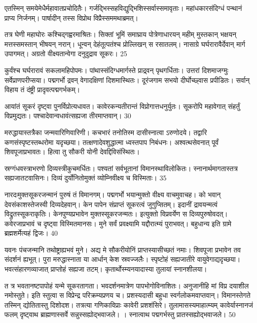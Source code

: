   एतस्मिन् समयेमेधैर्महावातप्रचोदितैः।
 गर्जद्भिस्सहविद्युद्भिशिस्सर्वास्समावृताः।
 महांधकारसंदिग्धं पन्थानं प्राप्य निर्जनम्।
 पार्षादीन् तस्स विप्रोथ विप्रैस्सममथाब्रमत्।
 
तत्र घेणी महाघोरः कश्चिद्गह्वरमाश्रितः।
 सिक्तां भूमिं समाघ्राय पोत्रेणाधारयन् महीम् मुस्तकान् भक्षयन् मत्तस्समस्तान् भीषयन् नरान्।
 धून्वन् देहंतूत्पतंश्च प्रोल्लिखन् स रसातलम्।
 नासाग्रे घर्घरारावैर्देवान् मार्ग उपागमत्।
 अग्रतो वीक्ष्यतान्वेगा दनुदुद्राव सूकरः।
 25

  कुर्वंश्च घर्घरारावं सकलामहिपोपमः।
 पांथास्संदिग्धमार्गस्ते प्राद्र्वन् पृथगर्धिताः।
 उत्तरां दिशमाजग्मुः सर्वेप्राणपरीप्सया।
 पद्मगर्भो द्रवन् वेगादक्षिणां दिशमास्थितः।
 दूरंजगाम सभयो दीर्घोच्छ्वास प्रपीडितः।
 सर्वान् विहाय तं दंष्ट्री प्रादृवत्पद्मगर्भकम्।
 
आयांतं सूकरं दृष्ट्वा पुनर्विप्रोत्यधावत।
 कावेरकन्यतीरान्तं विप्रोगात्तधनुर्युतः।
 सूकरोपि महावेगात् संहर्तुं विप्रमुद्यतः।
 पश्चादेवान्वधावंत्सह्यजा तीरमाप्तवान्।
 30

  मरुद्धायास्तत्रैका जन्मवारिणिवारिणी।
 कचभारं तनोतिस्म दासीस्नात्वा ऽरुणोदये।
 तद्वारि कणसंस्पृष्टस्तब्धरोमा यदृच्छया।
 तत्क्षणादेवशुद्धात्मा ध्वस्तपाप निबंधनः।
 अश्वत्थसेवनात् पूर्वं शिवपूजाप्रभावतः।
 हित्वा तु सौकरी योनी देवद्दिविसंस्थितः।
 
स्रग्गंधवस्त्राभरणो दिव्यस्त्रीकुचमर्धितः।
 पश्यतां सर्वभूतानां विमानस्थाविलोकितः।
 स्नानार्थमागतास्तत्र सह्यजातटवासिनः।
 दिव्यं दुर्योनितोमुक्तं व्योम्निवीक्ष्य च विस्मिताः।
 35

  नारदःमुक्तसूकरजन्मानं पुरुषं तं विमानगम्।
 पद्मगर्भो भयान्मुक्तो वीक्ष्य वाचमुवाचह।
 को भवान् देवसंकाशस्तेजस्वी दिव्यदेहवान्।
 केन पापेन संप्राप्तं सूकरत्वं जुगुप्सितम्।
 इदानीं द्रावयन्मत्वं विद्रुतस्सूकराकृतिः।
 केनपुण्यप्रभावेन मुक्तस्सूकरजन्मतः।
 इत्युक्तो विप्रवर्येण स दिव्यपुरुषोवदत्।
 कवेरजाप्रभावं च दृष्ट्वा विस्मितमानसः।
 मुने सर्वं प्रवक्ष्यामि यद्दौरात्म्यं पुराभवत्।
 बहुधान्य इति ग्रामे ब्रह्मशर्मेत्यहं द्विजः।
 40

  यवनः पंचजन्मानि तथोष्ट्राह्यभवं मुने।
 अद्य मे सौकरीयोनिं प्राप्तस्यासीच्छतं नमाः।
 शिवपूजा प्रभावेन तव संदर्शनं ह्यभूत्।
 पुरा मरुद्धास्नाता या आर्धान् केश स्रवज्जलैः।
 स्पृष्टोहं सह्यजातीरे वायुवेगाद्यदृच्छया।
 भवत्संहारणव्याजात् प्राप्तोहं सह्यजा तटम्।
 कृतार्थोस्म्यनयादास्या तुलायां स्नानशीलया।
 
त
त्र
भवतानष्टपापोहं यन्मे सूकरतागता।
 भवदर्शनमात्रेण पापभोगोविनाशितः।
 अनुजानीहि मां विप्र दयाशील नमोस्तुते।
 इति स्तुत्वा स विप्रेन्द्र परिक्रम्यप्रणय च।
 प्रशस्यदासी बहुधा स्वर्गलोकमवाप्तवान्।
 विमानस्तेगते तस्मिन् द्योतितास्तु दिशोदश।
 तत्रत्या गणिकाविप्राः कावेरी प्रशशंसिरे।
 तुलामासस्यमाहात्म्यम् कावेर्यास्नानजं फलम् दृष्ट्वाथ ब्राह्मणास्सर्वे सन्नुस्सह्योद्भवाजले।
 ।
 स्नात्वाथ पद्मगर्भस्तु प्रातस्सह्योद्भवाजले।
 50

